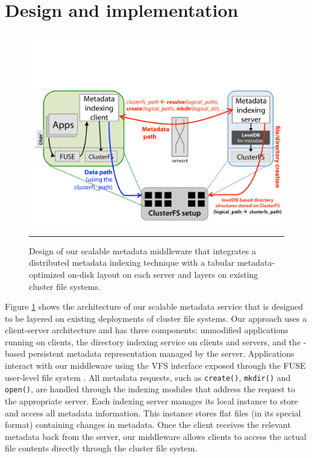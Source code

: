 \section{Design and implementation}

\begin{figure}[t]   %
\centerline{\includegraphics[scale=0.3]{./figs/giga-impl-leveldb-clusterfs}}
\caption{
{\small
Design of our scalable metadata middleware that integrates a distributed metadata indexing
technique with a tabular metadata-optimized on-disk layout on each server and
layers on existing cluster file systems. 
}
}
\vspace{10pt}
\hrule 
\label{fig:design}
\end{figure}       %

Figure \ref{fig:design} shows the architecture of our scalable metadata
service that is designed to be layered on existing deployments of cluster file
systems. Our approach uses a client-server architecture and has three components: 
unmodified applications running on clients, the \giga{} directory indexing service 
on clients and servers, and the \ldb{}-based persistent metadata representation 
managed by the server.
Applications interact with our middleware using the VFS interface exposed
through the FUSE user-level file system \cite{fuse}.
All metadata requests, such as \texttt{create()}, \texttt{mkdir()} and
\texttt{open()}, are handled through the \giga indexing modules that address
the request to the appropriate server.
Each indexing server manages its local \ldb instance to store and access all
metadata information. This \ldb instance stores flat files (in its special
format) containing changes in metadata. 
Once the client receives the relevant metadata back from the server, our
middleware allows clients to access the actual file contents directly through
the cluster file system.

